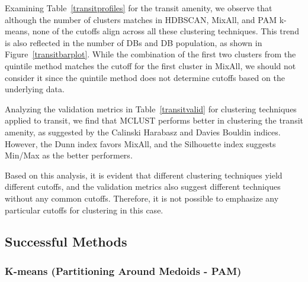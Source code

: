 \documentclass[11pt, a4paper]{article}
\begin{document}
Examining Table~\ref{transitprofiles} for the transit amenity, we observe that although the number of clusters matches in HDBSCAN, MixAll, and PAM k-means, none of the cutoffs align across all these clustering techniques. This trend is also reflected in the number of DBs and DB population, as shown in Figure~\ref{transitbarplot}. While the combination of the first two clusters from the quintile method matches the cutoff for the first cluster in MixAll, we should not consider it since the quintile method does not determine cutoffs based on the underlying data.
\par
Analyzing the validation metrics in Table~\ref{transitvalid} for clustering techniques applied to transit, we find that MCLUST performs better in clustering the transit amenity, as suggested by the Calinski Harabasz and Davies Bouldin indices. However, the Dunn index favors MixAll, and the Silhouette index suggests Min/Max as the better performers.
\par
Based on this analysis, it is evident that different clustering techniques yield different cutoffs, and the validation metrics also suggest different techniques without any common cutoffs. Therefore, it is not possible to emphasize any particular cutoffs for clustering in this case.










\pagebreak
\subsection{Successful Methods}\label{appendix:successful}


\subsubsection{K-means (Partitioning Around Medoids - PAM)}
\end{document}
